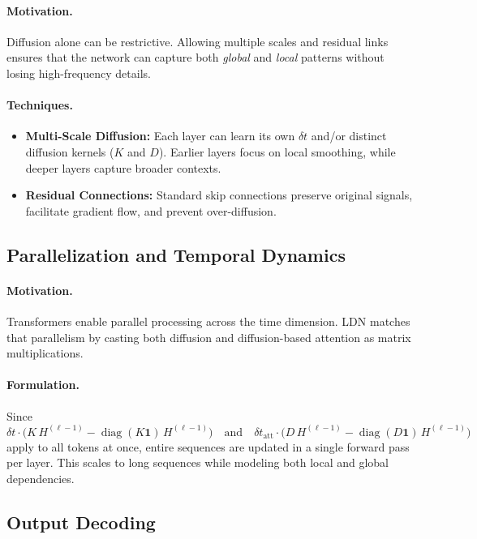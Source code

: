\paragraph{Motivation.}
Diffusion alone can be restrictive. Allowing multiple scales and residual links ensures that the network can capture both \emph{global} and \emph{local} patterns without losing high-frequency details.

\paragraph{Techniques.}
\begin{itemize}
    \item \textbf{Multi-Scale Diffusion:} Each layer can learn its own \(\delta t\) and/or distinct diffusion kernels (\(K\) and \(D\)). Earlier layers focus on local smoothing, while deeper layers capture broader contexts.
    \item \textbf{Residual Connections:} Standard skip connections preserve original signals, facilitate gradient flow, and prevent over-diffusion.
\end{itemize}

\subsection{Parallelization and Temporal Dynamics}
\paragraph{Motivation.}
Transformers enable parallel processing across the time dimension. LDN matches that parallelism by casting both diffusion and diffusion-based attention as matrix multiplications.

\paragraph{Formulation.}
Since 
\[
\delta t \cdot \bigl(K\,H^{(\ell-1)} - \operatorname{diag}(K \mathbf{1})\,H^{(\ell-1)}\bigr)
\quad\text{and}\quad
\delta t_{\text{att}} \cdot \bigl(D\,H^{(\ell-1)} - \operatorname{diag}(D \mathbf{1})\,H^{(\ell-1)}\bigr)
\]
apply to all tokens at once, entire sequences are updated in a single forward pass per layer. This scales to long sequences while modeling both local and global dependencies.

\subsection{Output Decoding}
